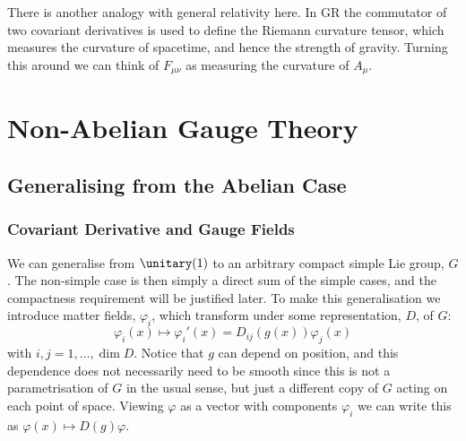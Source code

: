 \documentclass[fleqn]{NotesClass}
\begin{document}
    \begin{rmk}
        There is another analogy with general relativity here.
        In GR the commutator of two covariant derivatives is used to define the Riemann curvature tensor, which measures the curvature of spacetime, and hence the strength of gravity.
        Turning this around we can think of \(F_{\mu\nu}\) as measuring the curvature of \(A_\mu\).
    \end{rmk}
    
    \chapter{Non-Abelian Gauge Theory}
    \section{Generalising from the Abelian Case}
    \subsection{Covariant Derivative and Gauge Fields}
    We can generalise from \(\unitary(1)\) to an arbitrary compact simple Lie group, \(G\).
    The non-simple case is then simply a direct sum of the simple cases, and the compactness requirement will be justified later.
    To make this generalisation we introduce matter fields, \(\varphi_i\), which transform under some representation, \(D\), of \(G\):
    \begin{equation}
        \varphi_i(x) \mapsto \varphi_i'(x) = D_{ij}(g(x)) \varphi_j(x)
    \end{equation}
    with \(i, j = 1, \dotsc, \dim D\).
    Notice that \(g\) can depend on position, and this dependence does not necessarily need to be smooth since this is not a parametrisation of \(G\) in the usual sense, but just a different copy of \(G\) acting on each point of space.
    Viewing \(\varphi\) as a vector with components \(\varphi_i\) we can write this as \(\varphi(x) \mapsto D(g)\varphi\).
    
\end{document}
